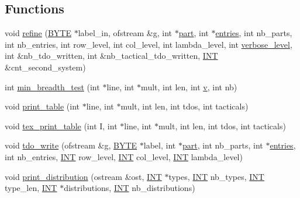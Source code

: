 \subsection*{Functions}
\begin{DoxyCompactItemize}
\item 
void \mbox{\hyperlink{tdo__refine__all_8_c_a69603cf79885d852e0a2b12223f10462}{refine}} (\mbox{\hyperlink{galois_8h_ab6cc7b4aeb6ea31aba2b3fbfc83ff5e6}{B\+Y\+TE}} $\ast$label\+\_\+in, ofstream \&g, int $\ast$\mbox{\hyperlink{tdo__refine__all_8_c_af32a7ef139fc39ca4f560f3a90a83b89}{part}}, int $\ast$\mbox{\hyperlink{tdo__refine__all_8_c_ad9086a751cffd4ad4acff2d919aa0e9a}{entries}}, int nb\+\_\+parts, int nb\+\_\+entries, int row\+\_\+level, int col\+\_\+level, int lambda\+\_\+level, int \mbox{\hyperlink{simeon_8_c_a818073fbcc2f439e7c56952f67386122}{verbose\+\_\+level}}, int \&nb\+\_\+tdo\+\_\+written, int \&nb\+\_\+tactical\+\_\+tdo\+\_\+written, \mbox{\hyperlink{galois_8h_a09fddde158a3a20bd2dcadb609de11dc}{I\+NT}} \&cnt\+\_\+second\+\_\+system)
\item 
int \mbox{\hyperlink{tdo__refine__all_8_c_aaea0b3ff8d16bdd0b235d2823f6bfcb1}{min\+\_\+breadth\+\_\+test}} (int $\ast$line, int $\ast$mult, int len, int \mbox{\hyperlink{simeon_8_c_aeb3f3030944801b163bc3b829a7f6710}{v}}, int nb)
\item 
void \mbox{\hyperlink{tdo__refine__all_8_c_a7d70eff8b2fce8dc35630b6334f03f59}{print\+\_\+table}} (int $\ast$line, int $\ast$mult, int len, int tdos, int tacticals)
\item 
void \mbox{\hyperlink{tdo__refine__all_8_c_ab9daab59537326d47c7f3265550c2890}{tex\+\_\+print\+\_\+table}} (int I, int $\ast$line, int $\ast$mult, int len, int tdos, int tacticals)
\item 
void \mbox{\hyperlink{tdo__refine__all_8_c_aab667cbb1bb3e5e2eea359bee495c9df}{tdo\+\_\+write}} (ofstream \&g, \mbox{\hyperlink{galois_8h_ab6cc7b4aeb6ea31aba2b3fbfc83ff5e6}{B\+Y\+TE}} $\ast$label, int $\ast$\mbox{\hyperlink{tdo__refine__all_8_c_af32a7ef139fc39ca4f560f3a90a83b89}{part}}, int nb\+\_\+parts, int $\ast$\mbox{\hyperlink{tdo__refine__all_8_c_ad9086a751cffd4ad4acff2d919aa0e9a}{entries}}, int nb\+\_\+entries, \mbox{\hyperlink{galois_8h_a09fddde158a3a20bd2dcadb609de11dc}{I\+NT}} row\+\_\+level, \mbox{\hyperlink{galois_8h_a09fddde158a3a20bd2dcadb609de11dc}{I\+NT}} col\+\_\+level, \mbox{\hyperlink{galois_8h_a09fddde158a3a20bd2dcadb609de11dc}{I\+NT}} lambda\+\_\+level)
\item 
void \mbox{\hyperlink{tdo__refine__all_8_c_a3d4fe27380b7b1e19b559b17f0de36c1}{print\+\_\+distribution}} (ostream \&ost, \mbox{\hyperlink{galois_8h_a09fddde158a3a20bd2dcadb609de11dc}{I\+NT}} $\ast$types, \mbox{\hyperlink{galois_8h_a09fddde158a3a20bd2dcadb609de11dc}{I\+NT}} nb\+\_\+types, \mbox{\hyperlink{galois_8h_a09fddde158a3a20bd2dcadb609de11dc}{I\+NT}} type\+\_\+len, \mbox{\hyperlink{galois_8h_a09fddde158a3a20bd2dcadb609de11dc}{I\+NT}} $\ast$distributions, \mbox{\hyperlink{galois_8h_a09fddde158a3a20bd2dcadb609de11dc}{I\+NT}} nb\+\_\+distributions)

\end{DoxyCompactItemize}
